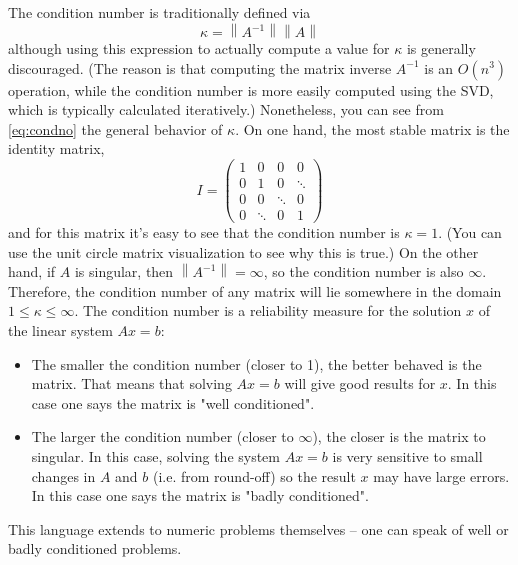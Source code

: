 \documentclass[onefignum,onetabnum]{siamart190516}
\begin{document}
The condition number is traditionally defined via
\begin{equation}
\label{eq:condno}
\kappa = {\left\lVert A^{-1} \right\rVert}  {\left\lVert A \right\rVert}
\end{equation}
although using this expression to actually compute a value for
 $\kappa$ is generally
discouraged.  (The reason is that computing the matrix inverse $A^{-1}$
is an $O(n^3)$ operation, while the condition number is more easily
computed using the SVD, which is typically calculated
iteratively.)  Nonetheless, you can see from \cref{eq:condno}
the general behavior of $\kappa$.  On one hand, the most stable matrix
is the identity matrix,
$$
I = 
\begin{pmatrix}
1 & 0 & 0 & 0 \\
0 & 1 & 0 &  \ddots \\
0 & 0 & \ddots & 0 \\
0 & \ddots & 0 & 1
\end{pmatrix}
$$
and for this matrix it's easy to see that the condition number is $\kappa = 1$.  (You can use the unit circle matrix visualization to see why this is true.)
On the other hand, if $A$ is singular, then ${\left\lVert A^{-1} \right\rVert}
= \infty$, so the condition number is also $\infty$.  Therefore, the condition
number of any matrix will lie somewhere in the domain $1 \leq \kappa \leq \infty$.
The condition number is a reliability measure for the solution $x$ of 
the linear system $A x = b$:
\begin{itemize}
	\item The smaller the condition number (closer to 1), the better behaved is
	the matrix.  That means that solving $A x = b$ will give good results for $x$.
	In this case one says the matrix is "well conditioned".
	\item The larger the condition number (closer to $\infty$), the closer
	is the matrix to singular.  In this case, solving the system $A x = b$ 
	is very sensitive to small changes in $A$ and $b$ (i.e. from round-off) so
	the result $x$ may have large errors.  In this case one says the matrix is
	"badly conditioned".
\end{itemize}
This language extends to
numeric problems themselves -- one can speak of well or 
badly conditioned problems.
\end{document}

